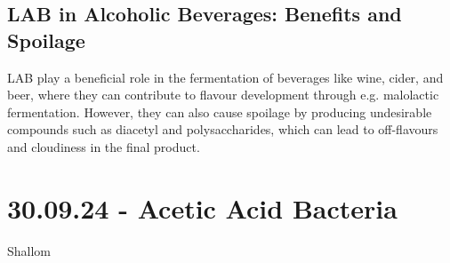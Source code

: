 \subsection{LAB in Alcoholic Beverages: Benefits and Spoilage}
LAB play a beneficial role in the fermentation of beverages like wine, cider, and beer, where they can contribute to flavour development through e.g. malolactic fermentation. However, they can also cause spoilage by producing undesirable compounds such as diacetyl and polysaccharides, which can lead to off-flavours and cloudiness in the final product.

\section{30.09.24 - Acetic Acid Bacteria}
Shallom

